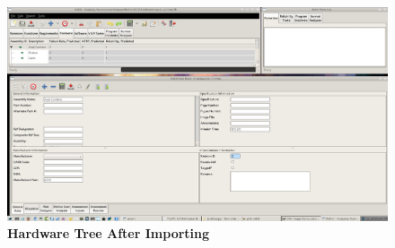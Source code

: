 \documentclass[11pt, 12pt, twoside, onecolumn]{book}
\begin{document}
\begin{landscape}
	\begin{figure}[htbp]
		\centering
		\includegraphics[width=18cm]{./figures/new_project_import_bom_3}
		\caption{\textbf{Hardware Tree After Importing}}
		\label{fig:new_project_hardware_after_import}
	\end{figure}
\end{landscape}

	
\end{document}
